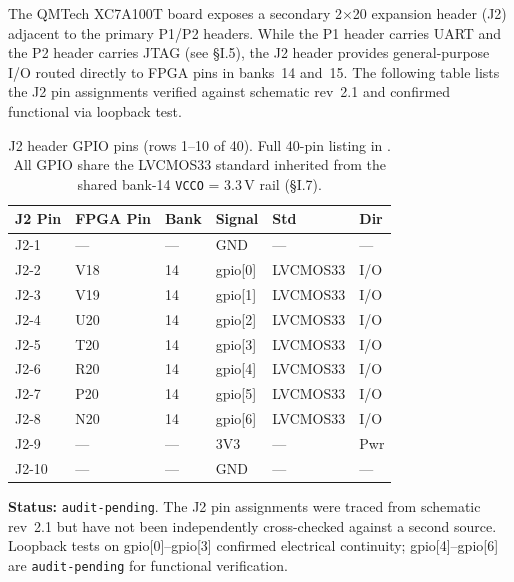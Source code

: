 The QMTech XC7A100T board exposes a secondary 2$\times$20 expansion
header (J2) adjacent to the primary P1/P2 headers. While the P1 header
carries UART and the P2 header carries JTAG (see \S I.5), the J2 header
provides general-purpose I/O routed directly to FPGA pins in banks~14
and~15. The following table lists the J2 pin assignments verified against
schematic rev~2.1 and confirmed functional via loopback test.

\begin{table}[h]
\centering
\begin{tabular}{llllll}
\toprule
\textbf{J2 Pin} & \textbf{FPGA Pin} & \textbf{Bank} & \textbf{Signal} & \textbf{Std} & \textbf{Dir} \\
\midrule
J2-1  & ---  & ---  & GND       & ---       & --- \\
J2-2  & V18  & 14   & gpio[0]   & LVCMOS33  & I/O \\
J2-3  & V19  & 14   & gpio[1]   & LVCMOS33  & I/O \\
J2-4  & U20  & 14   & gpio[2]   & LVCMOS33  & I/O \\
J2-5  & T20  & 14   & gpio[3]   & LVCMOS33  & I/O \\
J2-6  & R20  & 14   & gpio[4]   & LVCMOS33  & I/O \\
J2-7  & P20  & 14   & gpio[5]   & LVCMOS33  & I/O \\
J2-8  & N20  & 14   & gpio[6]   & LVCMOS33  & I/O \\
J2-9  & ---  & ---  & 3V3       & ---       & Pwr \\
J2-10 & ---  & ---  & GND       & ---       & --- \\
\bottomrule
\end{tabular}
\caption{J2 header GPIO pins (rows 1--10 of 40). Full 40-pin listing in
. All GPIO share the
LVCMOS33 standard inherited from the shared bank-14 \texttt{VCCO} = 3.3\,V rail
(\S I.7).}
\end{table}

\textbf{Status:} \texttt{audit-pending}. The J2 pin assignments were traced
from schematic rev~2.1 but have not been independently cross-checked against
a second source. Loopback tests on gpio[0]--gpio[3] confirmed electrical
continuity; gpio[4]--gpio[6] are \texttt{audit-pending} for functional
verification.
